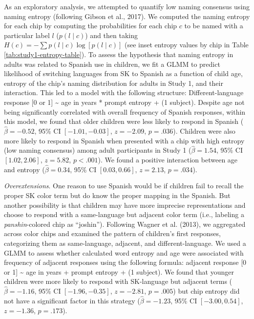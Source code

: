 \documentclass[
  english,
  ,man,floatsintext]{apa6}
\begin{document}
As an exploratory analysis, we attempted to quantify low naming consensus using naming entropy (following Gibson et al., 2017). We computed the naming entropy for each chip by computing the probabilities for each chip \(c\) to be named with a particular label \(l\) (\(p(l \mid c)\)) and then taking \(H(c) = - \sum{p(l\mid c) \log[p(l \mid c)]}\) (see inset entropy values by chip in Table \ref{tab:study1-entropy-table}).
To assess the hypothesis that naming entropy in adults was related to Spanish use in children, we fit a GLMM to predict likelihood of switching languages from SK to Spanish as a function of child age, entropy of the chip's naming distribution for adults in Study 1, and their interaction. This led to a model with the following structure: Different-language response {[}0 or 1{]} \textasciitilde{} age in years * prompt entropy + (1 \textbar{} subject). Despite age not being significantly correlated with overall frequency of Spanish responses, within this model, we found that older children were less likely to respond in Spanish (\(\hat{\beta} = -0.52\), 95\% CI \([-1.01, -0.03]\), \(z = -2.09\), \(p = .036\)). Children were also more likely to respond in Spanish when presented with a chip with high entropy (low naming consensus) among adult participants in Study 1 (\(\hat{\beta} = 1.54\), 95\% CI \([1.02, 2.06]\), \(z = 5.82\), \(p < .001\)). We found a positive interaction between age and entropy (\(\hat{\beta} = 0.34\), 95\% CI \([0.03, 0.66]\), \(z = 2.13\), \(p = .034\)).

\emph{Overextensions}. One reason to use Spanish would be if children fail to recall the proper SK color term but do know the proper mapping in the Spanish. But another possibility is that children may have more imprecise representations and choose to respond with a same-language but adjacent color term (i.e., labeling a \emph{panshin}-colored chip as \enquote{joshin}). Following Wagner et al. (2013), we aggregated across color chips and examined the pattern of children's first responses, categorizing them as same-language, adjacent, and different-language. We used a GLMM to assess whether calculated word entropy and age were associated with frequency of adjacent responses using the following formula: adjacent response {[}0 or 1{]} \textasciitilde{} age in years + prompt entropy + (1 \textbar{} subject). We found that younger children were more likely to respond with SK-language but adjacent terms (\(\hat{\beta} = -1.16\), 95\% CI \([-1.96, -0.35]\), \(z = -2.81\), \(p = .005\)) but chip entropy did not have a significant factor in this strategy (\(\hat{\beta} = -1.23\), 95\% CI \([-3.00, 0.54]\), \(z = -1.36\), \(p = .173\)).
\end{document}
